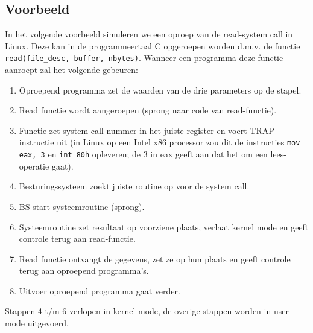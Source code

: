 \subsection{Voorbeeld}

In het volgende voorbeeld simuleren we een oproep van de
read-system call in Linux. Deze kan in de programmeertaal C opgeroepen
worden d.m.v. de functie \texttt{read(file\_desc, buffer, nbytes)}. Wanneer een
programma deze functie aanroept zal het volgende gebeuren:

\begin{enumerate}
\item Oproepend programma zet de waarden van de drie parameters op de stapel.
\item Read functie wordt aangeroepen (sprong naar code van read-functie).
\item Functie zet system call nummer in het juiste register en voert
TRAP-instructie uit (in Linux op een Intel x86 processor zou dit de instructies \texttt{mov eax, 3}
en \texttt{int 80h} opleveren; de 3 in eax geeft aan dat het om een lees-operatie gaat).
\item Besturingssysteem zoekt juiste routine op voor de system call.
\item BS start systeemroutine (sprong).
\item Systeemroutine zet resultaat op voorziene plaats, verlaat kernel mode en
geeft controle terug aan read-functie.
\item Read functie ontvangt de gegevens, zet ze op hun plaats en geeft controle
terug aan oproepend programma's.
\item Uitvoer oproepend programma gaat verder.
\end{enumerate}

Stappen 4 t/m 6 verlopen in kernel mode, de overige stappen worden in user mode
uitgevoerd.


